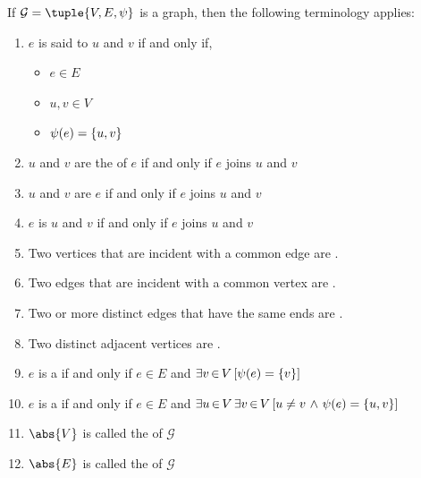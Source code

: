 \begin{dfn}
    If \( \mathcal{G} = \tuple{V, E, \psi} \) is a graph, then the following terminology applies:
    \begin{enumerate}[topsep=2pt,label=\textup{\texttt{(\alph*)}}]
        \item \( e \) is said to  \( u \) and \( v \) if and only if,
            \begin{itemize}[topsep=2pt]
                \item \( e \in E \)
                \item \( u, v \in V \)
                \item \( \psi(e) = \mleft\{ u, v \mright\} \)
            \end{itemize}
        \item \( u \) and \( v \) are the  of \( e \) if and only if \( e \) joins \( u \) and \( v \)
        \item \( u \) and \( v \) are  \( e \) if and only if \( e \) joins \( u \) and \( v \)
        \item \( e \) is  \( u \) and \( v \) if and only if \( e \) joins \( u \) and \( v \)
        \item Two vertices that are incident with a common edge are .  \label{enum:graph-adjacent-vertices}
        \item Two edges that are incident with a common vertex are .
        \item Two or more distinct edges that have the same ends are .  \label{enum:graph-parallel-edges}
        \item Two distinct adjacent vertices are .
        \item \( e \) is a  if and only if \( e \in E \) and \( \exists v\,{\in}\,V \, \mleft[ \psi(e) = \mleft\{ v \mright\} \mright] \)
             \label{enum:graph-loop}
        \item \( e \) is a  if and only if \( e \in E \) and
            \( \exists u\,{\in}\,V \, \exists v\,{\in}\,V \, \mleft[ u \neq v \,\,{\land}\,\, \psi(e) = \mleft\{ u, v \mright\} \mright] \)
             \label{enum:graph-link}
        \item \( \abs{V} \) is called the  of \( \mathcal{G} \)
        \item \( \abs{E} \) is called the  of \( \mathcal{G} \)
    \end{enumerate}
\end{dfn}

